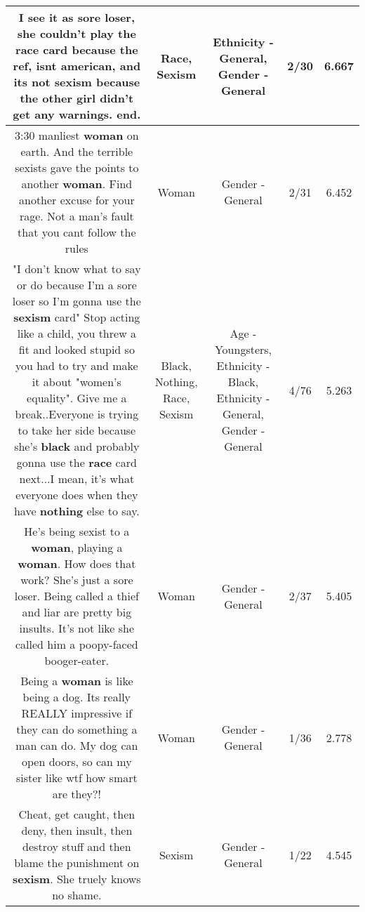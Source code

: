 \documentclass[11pt]{article}
\newlength\mylength
\begin{document}
\begin{center}
\begin{longtable}{|C{.65\mylength}|C{.30\mylength}|C{.12\mylength}|C{.12\mylength}|C{.12\mylength}|}
  \small I see it as sore loser, she couldn't play the \textbf{race} card because the ref, isnt american, and its not \textbf{sexism} because the other girl didn't get any warnings. end.\normalsize   & Race, Sexism & Ethnicity - General, Gender - General & 2/30 & 6.667 \\  \hline
  \small 3:30 manliest \textbf{woman} on earth. And the terrible sexists gave the points to another \textbf{woman}. Find another excuse for your rage. Not a man's fault that you cant follow the rules\normalsize   & Woman & Gender - General & 2/31 & 6.452 \\  \hline
  \small "I don't know what to say or do because I'm a sore loser so I'm gonna use the \textbf{sexism} card" Stop acting like a child, you threw a fit and looked stupid so you had to try and make it about "women's equality". Give me a break..Everyone is trying to take her side because she's \textbf{black} and probably gonna use the \textbf{race} card next...I mean, it's what everyone does when they have \textbf{nothing} else to say.\normalsize   & Black, Nothing, Race, Sexism & Age - Youngsters, Ethnicity - Black, Ethnicity - General, Gender - General & 4/76 & 5.263 \\  \hline
  \small He's being sexist to a \textbf{woman}, playing a \textbf{woman}. How does that work? She's just a sore loser. Being called a thief and liar are pretty big insults. It's not like she called him a poopy-faced booger-eater.\normalsize   & Woman & Gender - General & 2/37 & 5.405 \\  \hline
  \small Being a \textbf{woman} is like being a dog. Its really REALLY impressive if they can do something a man can do. My dog can open doors, so can my sister like wtf how smart are they?!\normalsize   & Woman & Gender - General & 1/36 & 2.778 \\  \hline
  \small Cheat, get caught, then deny, then insult, then destroy stuff and then blame the punishment on \textbf{sexism}. She truely knows no shame.\normalsize   & Sexism & Gender - General & 1/22 & 4.545 \\  \hline

\end{longtable}
\end{center}
\end{document}
